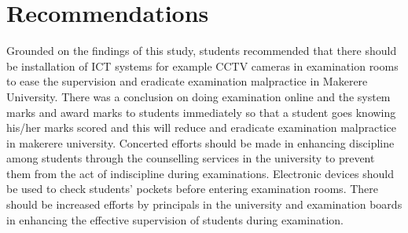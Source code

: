 \documentclass [8 pt]{article}
\begin{document}
\section {Recommendations}
Grounded on the findings of this study, students recommended that there should be installation of ICT systems for example CCTV cameras in examination rooms to ease the supervision and eradicate examination malpractice in Makerere University. There was a conclusion on doing examination online and the system marks and award marks to students immediately so that a student goes knowing his/her marks scored and this will reduce and eradicate examination malpractice in makerere university.
Concerted efforts should be made in enhancing discipline among students through the counselling services in the university to prevent them from the act of indiscipline during examinations. Electronic devices should be used to check students’ pockets before entering examination rooms.
There should be increased efforts by principals in the university and examination boards in enhancing the effective supervision of students during examination.
\end{document}
